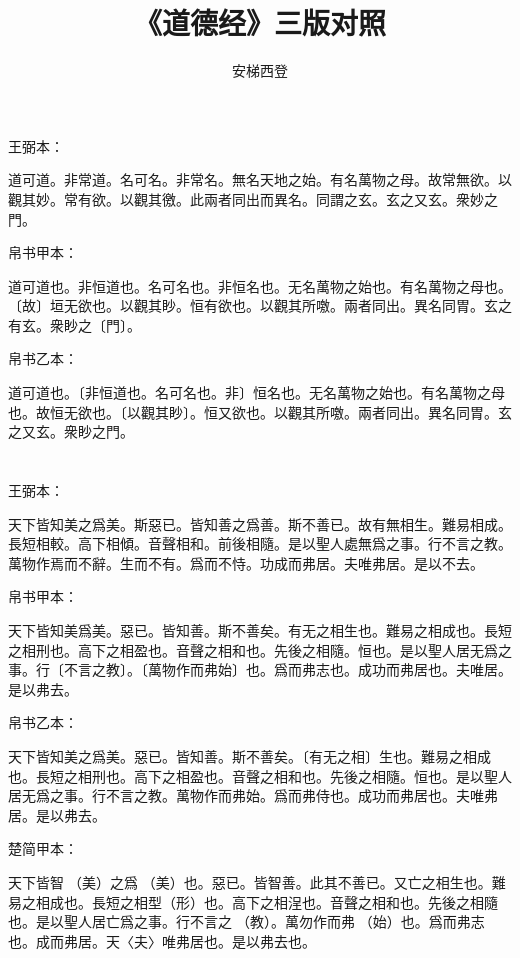 \documentclass[a5paper]{ctexbook}
\title{《道德经》三版对照}
\author{安梯西登}
\date{}
\begin{document}
    \maketitle

    \tableofcontents

    \chapter{}
    王弼本：

    道可道。非常道。名可名。非常名。無名天地之始。有名萬物之母。故常無欲。以觀其妙。常有欲。以觀其徼。此兩者同出而異名。同謂之玄。玄之又玄。衆妙之門。

    
    帛书甲本：

    道可道也。非恒道也。名可名也。非恒名也。无名萬物之始也。有名萬物之母也。〔故〕垣无欲也。以觀其眇。恒有欲也。以觀其所噭。兩者同出。異名同胃。玄之有玄。衆眇之〔門〕。

    帛书乙本：

    道可道也。〔非恒道也。名可名也。非〕恒名也。无名萬物之始也。有名萬物之母也。故恒无欲也。〔以觀其眇〕。恒又欲也。以觀其所噭。兩者同出。異名同胃。玄之又玄。衆眇之門。

    \chapter{}
    王弼本：

    天下皆知美之爲美。斯惡已。皆知善之爲善。斯不善已。故有無相生。難易相成。長短相較。高下相傾。音聲相和。前後相隨。是以聖人處無爲之事。行不言之教。萬物作焉而不辭。生而不有。爲而不恃。功成而弗居。夫唯弗居。是以不去。

    
    帛书甲本：

    天下皆知美爲美。惡已。皆知善。斯不善矣。有无之相生也。難易之相成也。長短之相刑也。高下之相盈也。音聲之相和也。先後之相隨。恒也。是以聖人居无爲之事。行〔不言之教〕。〔萬物作而弗始〕也。爲而弗志也。成功而弗居也。夫唯居。是以弗去。

    帛书乙本：

    天下皆知美之爲美。惡已。皆知善。斯不善矣。〔有无之相〕生也。難易之相成也。長短之相刑也。高下之相盈也。音聲之相和也。先後之相隨。恒也。是以聖人居无爲之事。行不言之教。萬物作而弗始。爲而弗侍也。成功而弗居也。夫唯弗居。是以弗去。

    楚简甲本：

    天下皆智𢼸（美）之爲󶴲（美）也。惡已。皆智善。此其不善已。又亡之相生也。難易之相成也。長短之相型（形）也。高下之相浧也。音聲之相和也。先後之相隨也。是以聖人居亡爲之事。行不言之𡥈（教）。萬勿作而弗󶴢（始）也。爲而弗志也。成而弗居。天〈夫〉唯弗居也。是以弗去也。
\end{document}
